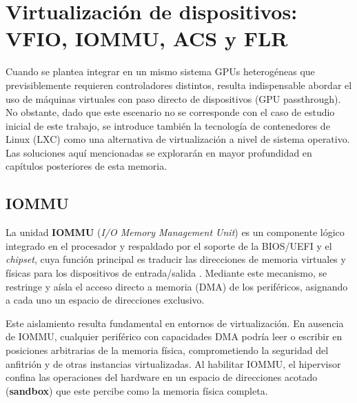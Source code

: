 \section{Virtualización de dispositivos: VFIO, IOMMU, ACS y FLR}
Cuando se plantea integrar en un mismo sistema GPUs heterogéneas que previsiblemente requieren 
controladores distintos, resulta indispensable abordar el uso de máquinas virtuales con paso directo 
de dispositivos (GPU passthrough). No obstante, dado que este escenario no se corresponde con el caso de
estudio inicial de este trabajo, se introduce también la tecnología de contenedores de Linux (LXC) como una
alternativa de virtualización a nivel de sistema operativo. Las soluciones aquí mencionadas se explorarán
en mayor profundidad en capítulos posteriores de esta memoria.

\subsection{IOMMU}

La unidad \textbf{IOMMU} (\textit{I/O Memory Management Unit}) es un componente lógico integrado en el procesador y respaldado por el soporte 
de la BIOS/UEFI y el \textit{chipset}, cuya función principal es traducir las direcciones de memoria virtuales y físicas para los dispositivos
de entrada/salida \cite{kernel_iommu,ms_sriov}. Mediante este mecanismo, se restringe y aísla el acceso directo a memoria (DMA) de los periféricos, 
asignando a cada uno un espacio de direcciones exclusivo.

Este aislamiento resulta fundamental en entornos de virtualización. En ausencia de IOMMU, cualquier periférico con capacidades DMA podría leer 
o escribir en posiciones arbitrarias de la memoria física, comprometiendo la seguridad del anfitrión y de otras instancias virtualizadas. Al 
habilitar IOMMU, el hipervisor confina las operaciones del hardware en un espacio de direcciones acotado (\textbf{sandbox}) que este percibe como la memoria 
física completa.

